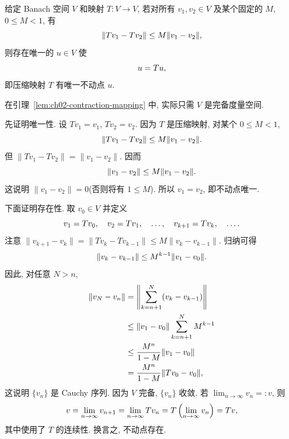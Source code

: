 \setcounter{thmcount}{1}
\begin{Lemma}[压缩映射原理]
\label{lem:ch02-contraction-mapping}
给定 Banach 空间 $V$ 和映射 $T:V\longrightarrow V$, 若对所有 $v_1,v_2\in V$ 及某个固定的 $M$, $0\leq M<1$, 有
\setcounter{equation}{2}
\begin{equation}
\MathBookFormulaID{formula-ch02-contraction-bound}
\|Tv_1-Tv_2\|\leq M\|v_1-v_2\|,
\label{eq:ch02-contraction-bound}
\end{equation}
则存在唯一的 $u\in V$ 使
\begin{equation}
\MathBookFormulaID{formula-ch02-fixed-point-equation}
u=Tu,
\label{eq:ch02-fixed-point-equation}
\end{equation}
即压缩映射 $T$ 有唯一不动点 $u$.
\end{Lemma}

\setcounter{thmcount}{4}
\begin{Remark}
\label{rem:ch02-complete-metric-suffices}
在引理~\ref{lem:ch02-contraction-mapping} 中, 实际只需 $V$ 是完备度量空间.
\end{Remark}

\begin{Proof}
先证明唯一性. 设 $Tv_1=v_1$, $Tv_2=v_2$. 因为 $T$ 是压缩映射, 对某个 $0\leq M<1$,
\[
\MathBookFormulaID{formula-ch02-fixed-point-uniqueness-contraction}
\|Tv_1-Tv_2\|\leq M\|v_1-v_2\|.
\]
但 $\|Tv_1-Tv_2\|=\|v_1-v_2\|$. 因而
\[
\MathBookFormulaID{formula-ch02-fixed-point-uniqueness-bound}
\|v_1-v_2\|\leq M\|v_1-v_2\|.
\]
这说明 $\|v_1-v_2\|=0$(否则将有 $1\leq M$). 所以 $v_1=v_2$, 即不动点唯一.

下面证明存在性. 取 $v_0\in V$ 并定义
\[
\MathBookFormulaID{formula-ch02-fixed-point-iteration}
v_1=Tv_0,\quad v_2=Tv_1,\quad\ldots,\quad v_{k+1}=Tv_k,\quad\ldots.
\]
注意 $\|v_{k+1}-v_k\|=\|Tv_k-Tv_{k-1}\|\leq M\|v_k-v_{k-1}\|$. 归纳可得
\[
\MathBookFormulaID{formula-ch02-fixed-point-successive-bound}
\|v_k-v_{k-1}\|\leq M^{k-1}\|v_1-v_0\|.
\]
因此, 对任意 $N>n$,
\setcounter{equation}{5}
\begin{equation}
\MathBookFormulaID{formula-ch02-fixed-point-cauchy-estimate}
\begin{aligned}
\|v_N-v_n\|
&=\left\|\sum_{k=n+1}^N(v_k-v_{k-1})\right\|\\
&\leq\|v_1-v_0\|\sum_{k=n+1}^NM^{k-1}\\
&\leq\frac{M^n}{1-M}\|v_1-v_0\|\\
&=\frac{M^n}{1-M}\|Tv_0-v_0\|,
\end{aligned}
\label{eq:ch02-fixed-point-cauchy-estimate}
\end{equation}
这说明 $\{v_n\}$ 是 Cauchy 序列. 因为 $V$ 完备, $\{v_n\}$ 收敛. 若 $\lim_{n\to\infty}v_n=:v$, 则
\[
\MathBookFormulaID{formula-ch02-fixed-point-limit}
v=\lim_{n\to\infty}v_{n+1}
=\lim_{n\to\infty}Tv_n
=T\left(\lim_{n\to\infty}v_n\right)
=Tv,
\]
其中使用了 $T$ 的连续性. 换言之, 不动点存在.
\end{Proof}

